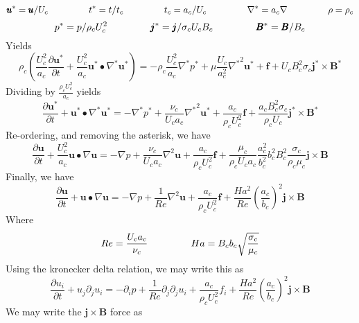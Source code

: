 \begin{equation}
\pmb{u}^* = \pmb{u}/U_c \;\;\;\;\;\;\;\;\;\;\;\;\;\;\;\;
t^* = t/t_c \;\;\;\;\;\;\;\;\;\;\;\;\;\;\;\;
t_c = a_c/U_c \;\;\;\;\;\;\;\;\;\;\;\;\;\;\;\;
\nabla^* = a_c \nabla \;\;\;\;\;\;\;\;\;\;\;\;\;\;\;\;
\rho = \rho_c
\end{equation}
\begin{equation}
p^* = p/\rho_c U_c^2 \;\;\;\;\;\;\;\;\;\;\;\;\;\;\;\;
\pmb{j}^* = \pmb{j}/ \sigma_c U_c B_c \;\;\;\;\;\;\;\;\;\;\;\;\;\;\;\;
\pmb{B}^* = \pmb{B}/B_c
\end{equation}
Yields
\begin{equation}
\rho_c \left( \frac{U_c^2}{a_c} \frac{\partial \pmb{u^*}}{\partial t} + \frac{U_c^2}{a_c} \pmb{u^*} \bullet \nabla^* \pmb{u^*} \right) = 
- \rho_c \frac{U_c^2}{a_c} \nabla^*  p^* + \mu \frac{U_c}{a_c^2} {\nabla^*}^2 \pmb{u^*} + \pmb{f} +
U_c B_c^2 \sigma_c \pmb{j^*} \times \pmb{B^*}
\end{equation}
Dividing by $\frac{\rho_c U_c^2}{a_c}$ yields
\begin{equation}
\frac{\partial \pmb{u^*}}{\partial t} + \pmb{u^*} \bullet \nabla^* \pmb{u^*} = 
- \nabla^*  p^* + 
\frac{\nu_c}{U_c a_c} {\nabla^*}^2 \pmb{u^*} + \frac{a_c}{\rho_c U_c^2} \pmb{f} + 
\frac{a_c B_c^2 \sigma_c}{\rho_c U_c} \pmb{j^*} \times \pmb{B^*}
\end{equation}
Re-ordering, and removing the asterisk, we have
\begin{equation}
\frac{\partial \pmb{u}}{\partial t} + \frac{U_c^2}{a_c} \pmb{u} \bullet \nabla \pmb{u} = 
- \nabla  p + 
\frac{\nu_c}{U_c a_c} {\nabla}^2 \pmb{u} + \frac{a_c}{\rho_c U_c^2} \pmb{f} + 
\frac{\mu_c}{\rho_c U_c a_c} 
\frac{a_c^2}{b_c^2} b_c^2 B_c^2 \frac{\sigma_c}{\rho_c \mu_c}
\pmb{j} \times \pmb{B}
\end{equation}
Finally, we have
\begin{equation}
\frac{\partial \pmb{u}}{\partial t} + \pmb{u} \bullet \nabla \pmb{u} = 
-\nabla  p + 
\frac{1}{Re} {\nabla}^2 \pmb{u} + \frac{a_c}{\rho_c U_c^2} \pmb{f} + 
\frac{Ha^2}{Re} \left( \frac{a_c}{b_c} \right)^2 \pmb{j} \times \pmb{B}
\end{equation}
Where
\begin{equation}
Re = \frac{U_c a_c}{\nu_c} \;\;\;\;\;\;\;\;\;\;\;\;\;\;\;\;
Ha = B_c b_c \sqrt{\frac{\sigma_c}{\mu_c}} \end{equation}
Using the kronecker delta relation, we may write this as
\begin{equation}
\frac{\partial u_i }{\partial t} + u_j \partial_j u_i = 
-\partial_i  p + 
\frac{1}{Re} \partial_j \partial_j u_i + 
\frac{a_c}{\rho_c U_c^2} f_i +
\frac{Ha^2}{Re} \left( \frac{a_c}{b_c} \right)^2 \pmb{j} \times \pmb{B}
\end{equation}
We may write the $\pmb{j}\times \pmb{B}$ force as

